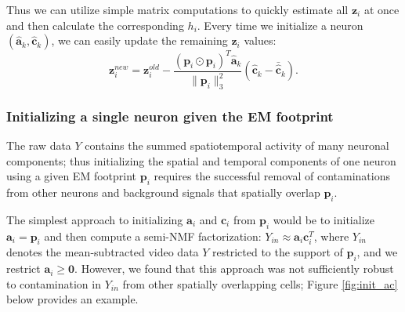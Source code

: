 \documentclass[10pt,letterpaper]{article}
\begin{document}
{%

Thus we can utilize simple matrix computations to quickly estimate all $\bm{z}_i$ at once and then calculate the corresponding $h_i$. Every time we initialize a neuron $(\hat{\bm{a}}_k, \hat{\bm{c}}_k)$, we can easily update the remaining $\bm{z}_i$ values:
\begin{equation}
    \bm{z}_i^{new} = \bm{z}_i^{old}- \frac{(\bm{p}_i\odot \bm{p}_i)^T\hat{\bm{a}}_k}{\|\bm{p}_i\|_3^2} (\hat{\bm{c}}_k-\bar{\hat{\bm{c}}}_k). 
\end{equation}



\subsubsection{Initializing a single neuron given the EM footprint}
\label{sec:init}
The raw data $Y$ contains the summed spatiotemporal activity of many neuronal components; thus initializing the spatial and temporal components of one neuron using a given EM footprint $\bm{p}_i$ requires the successful removal of contaminations from other neurons and background signals that spatially overlap $\bm{p}_i$. 

The simplest approach to initializing $\bm{a}_i$ and $\bm{c}_i$ from $\bm{p}_i$ would be to initialize $\bm{a}_i=\bm{p}_i$ and then compute a semi-NMF factorization: $Y_{in} \approx \bm{a}_i\bm{c}_i^T$, where $Y_{in}$ denotes the mean-subtracted video data $Y$ restricted to the support of $\bm{p}_i$, and we restrict $\bm{a}_i\geq \bm{0}$.  However, we found that this approach was not sufficiently robust to contamination in $Y_{in}$ from other spatially overlapping cells; Figure \ref{fig:init_ac} below provides an example.

}
\end{document}
